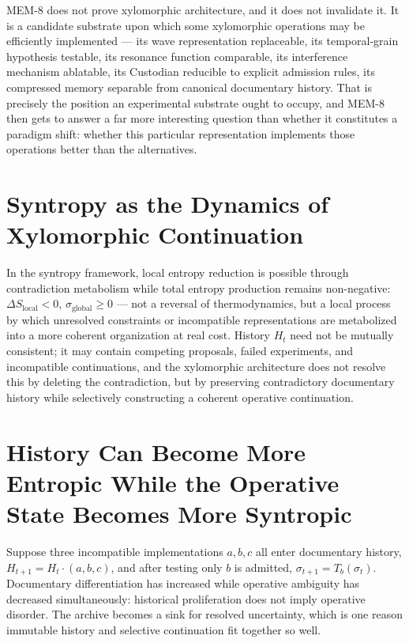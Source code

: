 \documentclass[12pt]{article}
\begin{document}
MEM-8 does not prove xylomorphic architecture, and it does not invalidate it. It is a candidate substrate upon which some xylomorphic operations may be efficiently implemented — its wave representation replaceable, its temporal-grain hypothesis testable, its resonance function comparable, its interference mechanism ablatable, its Custodian reducible to explicit admission rules, its compressed memory separable from canonical documentary history. That is precisely the position an experimental substrate ought to occupy, and MEM-8 then gets to answer a far more interesting question than whether it constitutes a paradigm shift: whether this particular representation implements those operations better than the alternatives.

\section{Syntropy as the Dynamics of Xylomorphic Continuation}

In the syntropy framework, local entropy reduction is possible through contradiction metabolism while total entropy production remains non-negative: $\Delta S_{\mathrm{local}}<0$, $\sigma_{\mathrm{global}}\geq0$ — not a reversal of thermodynamics, but a local process by which unresolved constraints or incompatible representations are metabolized into a more coherent organization at real cost. History $H_t$ need not be mutually consistent; it may contain competing proposals, failed experiments, and incompatible continuations, and the xylomorphic architecture does not resolve this by deleting the contradiction, but by preserving contradictory documentary history while selectively constructing a coherent operative continuation.

\section{History Can Become More Entropic While the Operative State Becomes More Syntropic}

Suppose three incompatible implementations $a,b,c$ all enter documentary history, $H_{t+1}=H_t\cdot(a,b,c)$, and after testing only $b$ is admitted, $\sigma_{t+1}=T_b(\sigma_t)$. Documentary differentiation has increased while operative ambiguity has decreased simultaneously: historical proliferation does not imply operative disorder. The archive becomes a sink for resolved uncertainty, which is one reason immutable history and selective continuation fit together so well.
\end{document}

